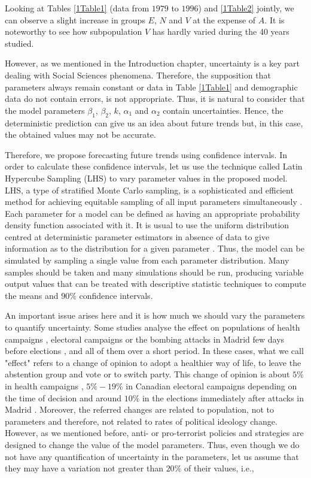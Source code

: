 Looking at Tables \ref{1Table1} (data from $1979$ to $1996$) and \ref{1Table2} jointly, we can observe a slight increase in groups $E$, $N$ and $V$ at the expense of $A$. It is noteworthy to see how subpopulation $V$ has hardly varied during the 40 years studied. 

However, as we mentioned in the Introduction chapter, uncertainty is a key part dealing with Social Sciences phenomena. Therefore, the supposition that parameters always remain constant or data in Table \ref{1Table1} and demographic data do not contain errors, is not appropriate. Thus, it is natural to consider that the model parameters $\beta_{1}$, $\beta_{2}$, $k$, $\alpha_{1}$ and $\alpha_{2}$ contain uncertainties. Hence, the deterministic prediction can give us an idea about future trends but, in this case, the obtained values may not be accurate.

Therefore, we propose forecasting future trends using confidence intervals. In order to calculate these confidence intervals, let us use the technique called Latin Hypercube Sampling (LHS) to vary parameter values in the proposed model. LHS, a type of stratified Monte Carlo sampling, is a sophisticated and efficient method for achieving equitable sampling of all input parameters simultaneously \cite{BLOWER, OLSSON}. Each parameter for a model can be defined as having an appropriate probability density function associated with it. It is usual to use the uniform distribution centred at deterministic parameter estimators in absence of data to give information as to the distribution for a given parameter \cite{MCKAY, OLSSON}. Thus, the model can be simulated by sampling a single value from each parameter distribution. Many samples should be taken and many simulations should be run, producing variable output values that can be treated with descriptive statistic techniques to compute the means and $90\%$ confidence intervals.

An important issue arises here and it is how much we should vary the parameters to quantify uncertainty. Some studies analyse the effect on populations of health campaigns \cite{SNYDER}, electoral campaigns \cite{FOURNIER} or the bombing attacks in Madrid few days before elections \cite{BALI}, and all of them over a short period. In these cases, what we call "effect" refers to a change of opinion to adopt a healthier way of life, to leave the abstention group and vote or to switch party. This change of opinion is about $5\%$ in health campaigns \cite{SNYDER}, $5\%-19\%$ in Canadian electoral campaigns depending on the time of decision \cite{FOURNIER} and around $10\%$ in the elections immediately after attacks in Madrid \cite{BALI}. Moreover, the referred changes are related to population, not to parameters and therefore, not related to rates of political ideology change. However, as we mentioned before, anti- or pro-terrorist policies and strategies are designed to change the value of the model parameters. Thus, even though we do not have any quantification of uncertainty in the parameters, let us assume that they may have a variation not greater than $20\%$ of their values, i.e., 

